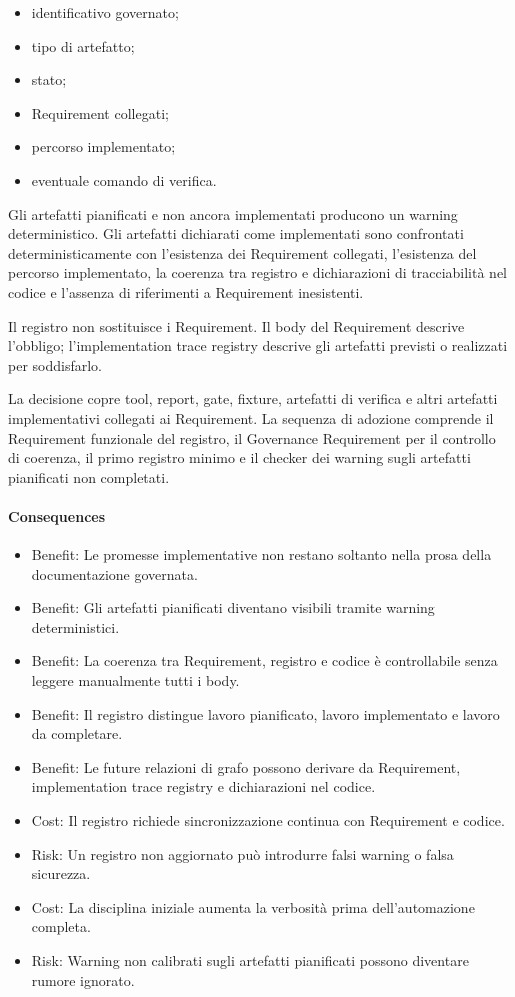 \documentclass[
  10pt,
]{article}
\providecommand{\tightlist}{%
  \setlength{\itemsep}{0pt}\setlength{\parskip}{0pt}}
\begin{document}
\begin{itemize}
\tightlist
\item
  identificativo governato;
\item
  tipo di artefatto;
\item
  stato;
\item
  Requirement collegati;
\item
  percorso implementato;
\item
  eventuale comando di verifica.
\end{itemize}

Gli artefatti pianificati e non ancora implementati producono un warning
deterministico. Gli artefatti dichiarati come implementati sono
confrontati deterministicamente con l'esistenza dei Requirement
collegati, l'esistenza del percorso implementato, la coerenza tra
registro e dichiarazioni di tracciabilità nel codice e l'assenza di
riferimenti a Requirement inesistenti.

Il registro non sostituisce i Requirement. Il body del Requirement
descrive l'obbligo; l'implementation trace registry descrive gli
artefatti previsti o realizzati per soddisfarlo.

La decisione copre tool, report, gate, fixture, artefatti di verifica e
altri artefatti implementativi collegati ai Requirement. La sequenza di
adozione comprende il Requirement funzionale del registro, il Governance
Requirement per il controllo di coerenza, il primo registro minimo e il
checker dei warning sugli artefatti pianificati non completati.

\paragraph{Consequences}\label{consequences-4}

\begin{itemize}
\tightlist
\item
  Benefit: Le promesse implementative non restano soltanto nella prosa
  della documentazione governata.
\item
  Benefit: Gli artefatti pianificati diventano visibili tramite warning
  deterministici.
\item
  Benefit: La coerenza tra Requirement, registro e codice è
  controllabile senza leggere manualmente tutti i body.
\item
  Benefit: Il registro distingue lavoro pianificato, lavoro implementato
  e lavoro da completare.
\item
  Benefit: Le future relazioni di grafo possono derivare da Requirement,
  implementation trace registry e dichiarazioni nel codice.
\item
  Cost: Il registro richiede sincronizzazione continua con Requirement e
  codice.
\item
  Risk: Un registro non aggiornato può introdurre falsi warning o falsa
  sicurezza.
\item
  Cost: La disciplina iniziale aumenta la verbosità prima
  dell'automazione completa.
\item
  Risk: Warning non calibrati sugli artefatti pianificati possono
  diventare rumore ignorato.
\end{itemize}
\end{document}
